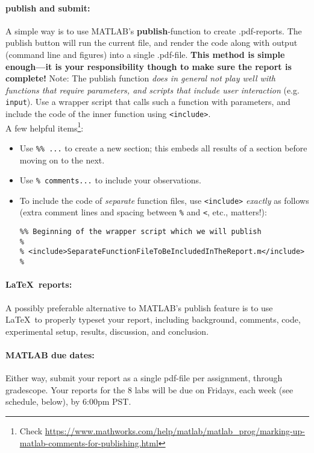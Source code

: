 \documentclass[11pt,letter]{article}
\begin{document}
\paragraph{publish and submit:}
A simple way is to use MATLAB's \textbf{publish}-function to create .pdf-reports. The publish button will run the current file, and render the code along with output (command line and figures) into a single .pdf-file. \textbf{This method is simple enough---it is your responsibility though to make sure the report is complete!} Note: The publish function \emph{does in general not play well with functions that require parameters, and scripts that include user interaction} (e.g. \texttt{input}). Use a wrapper script that calls such a function with parameters, and include the code of the inner function using \texttt{<include>}.\\

A few helpful items\footnote{Check \url{https://www.mathworks.com/help/matlab/matlab_prog/marking-up-matlab-comments-for-publishing.html}}:
\begin{itemize}
\item Use \verb|%% ...| to create a new section; this embeds all results of a section before moving on to the next.
\item Use \verb|% comments...| to include your observations.
\item To include the code of \emph{separate} function files, use \texttt{<include>} \emph{exactly} as follows (extra comment lines and spacing between \verb|%| and \verb|<|, etc., matters!):
\begin{verbatim}
%% Beginning of the wrapper script which we will publish
%
% <include>SeparateFunctionFileToBeIncludedInTheReport.m</include>
%
\end{verbatim}
\end{itemize}

\paragraph{\LaTeX\ reports:}
A possibly preferable alternative to MATLAB's publish feature is to use \LaTeX\ to properly typeset your report, including background, comments, code, experimental setup, results, discussion, and conclusion.

\paragraph{MATLAB due dates:}
Either way, submit your report as a single pdf-file per assignment, through gradescope. Your reports for the 8 labs will be due on Fridays, each week (see schedule, below), by 6:00pm PST. 
\end{document}
